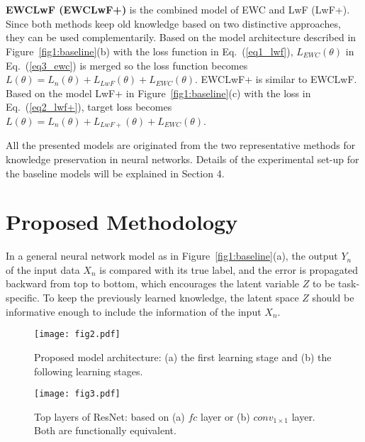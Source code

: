 \documentclass[runningheads,a4paper]{llncs}
\begin{document}
\\\\
\noindent\textbf{EWCLwF (EWCLwF+)} is the combined model of EWC and LwF (LwF+). Since both methods keep old knowledge based on two distinctive approaches, they can be used complementarily. Based on the model architecture described in Figure~\ref{fig1:baseline}(b) with the loss function in Eq.~(\ref{eq1_lwf}), $L_{EWC}(\theta)$ in Eq.~(\ref{eq3_ewc}) is merged so the loss function becomes $L(\theta) = L_n(\theta) + L_{LwF}(\theta) + L_{EWC}(\theta)$. EWCLwF+ is similar to EWCLwF. Based on the model LwF+ in Figure~\ref{fig1:baseline}(c) with the loss in Eq.~(\ref{eq2_lwf+}), target loss becomes $L(\theta) = L_n(\theta) + L_{LwF+}(\theta) + L_{EWC}(\theta)$.

All the presented models are originated from the two representative methods for knowledge preservation in neural networks. Details of the experimental set-up for the baseline models will be explained in Section 4.


\section{Proposed Methodology}

In a general neural network model as in Figure~\ref{fig1:baseline}(a), the output $Y_n$ of the input data $X_n$ is compared with its true label, and the error is propagated backward from top to bottom, which encourages the latent variable $Z$ to be task-specific. To keep the previously learned knowledge, the latent space $Z$ should be informative enough to include the information of the input $X_n$.

\begin{figure}[t]
\centering
\begin{minipage}{.48\textwidth}
  \centering
  \texttt{[image: fig2.pdf]}
  \caption{Proposed model architecture: (a) the first learning stage and (b) the following learning stages.}
  \label{fig2:proposed}
\end{minipage}%
\begin{minipage}{.02\textwidth}
\end{minipage}
\begin{minipage}{.02\textwidth}
\end{minipage}
\begin{minipage}{.48\textwidth}
  \centering
  \texttt{[image: fig3.pdf]}
  \caption{Top layers of ResNet: based on (a) $fc$ layer or (b) $conv_{1\times1}$ layer. Both are functionally equivalent.}
  \label{fig3:resnet_1x1}
\end{minipage}
\end{figure}
\end{document}

